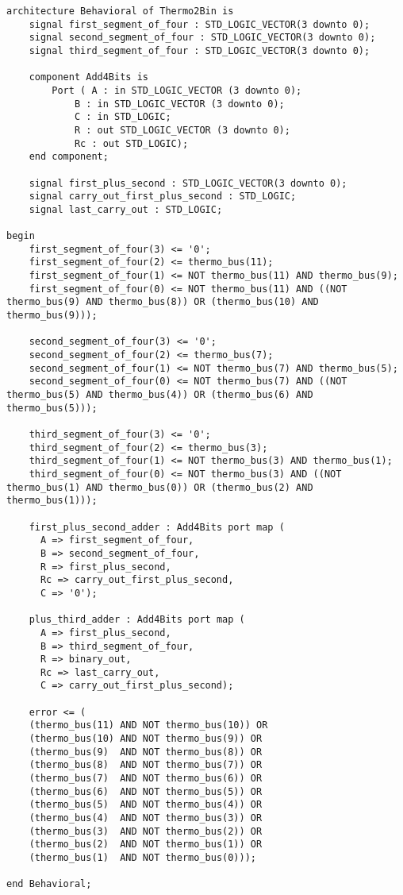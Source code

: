 \begin{verbatim}
architecture Behavioral of Thermo2Bin is
    signal first_segment_of_four : STD_LOGIC_VECTOR(3 downto 0);
    signal second_segment_of_four : STD_LOGIC_VECTOR(3 downto 0);
    signal third_segment_of_four : STD_LOGIC_VECTOR(3 downto 0);

    component Add4Bits is
        Port ( A : in STD_LOGIC_VECTOR (3 downto 0);
            B : in STD_LOGIC_VECTOR (3 downto 0);
            C : in STD_LOGIC;
            R : out STD_LOGIC_VECTOR (3 downto 0);
            Rc : out STD_LOGIC);
    end component;

    signal first_plus_second : STD_LOGIC_VECTOR(3 downto 0);
    signal carry_out_first_plus_second : STD_LOGIC;
    signal last_carry_out : STD_LOGIC;

begin
    first_segment_of_four(3) <= '0';
    first_segment_of_four(2) <= thermo_bus(11);
    first_segment_of_four(1) <= NOT thermo_bus(11) AND thermo_bus(9);
    first_segment_of_four(0) <= NOT thermo_bus(11) AND ((NOT thermo_bus(9) AND thermo_bus(8)) OR (thermo_bus(10) AND thermo_bus(9)));

    second_segment_of_four(3) <= '0';
    second_segment_of_four(2) <= thermo_bus(7);
    second_segment_of_four(1) <= NOT thermo_bus(7) AND thermo_bus(5);
    second_segment_of_four(0) <= NOT thermo_bus(7) AND ((NOT thermo_bus(5) AND thermo_bus(4)) OR (thermo_bus(6) AND thermo_bus(5)));

    third_segment_of_four(3) <= '0';
    third_segment_of_four(2) <= thermo_bus(3);
    third_segment_of_four(1) <= NOT thermo_bus(3) AND thermo_bus(1);
    third_segment_of_four(0) <= NOT thermo_bus(3) AND ((NOT thermo_bus(1) AND thermo_bus(0)) OR (thermo_bus(2) AND thermo_bus(1)));

    first_plus_second_adder : Add4Bits port map (
      A => first_segment_of_four,
      B => second_segment_of_four,
      R => first_plus_second,
      Rc => carry_out_first_plus_second,
      C => '0');

    plus_third_adder : Add4Bits port map (
      A => first_plus_second,
      B => third_segment_of_four,
      R => binary_out,
      Rc => last_carry_out,
      C => carry_out_first_plus_second);

    error <= (
    (thermo_bus(11) AND NOT thermo_bus(10)) OR
    (thermo_bus(10) AND NOT thermo_bus(9)) OR
    (thermo_bus(9)  AND NOT thermo_bus(8)) OR
    (thermo_bus(8)  AND NOT thermo_bus(7)) OR
    (thermo_bus(7)  AND NOT thermo_bus(6)) OR
    (thermo_bus(6)  AND NOT thermo_bus(5)) OR
    (thermo_bus(5)  AND NOT thermo_bus(4)) OR
    (thermo_bus(4)  AND NOT thermo_bus(3)) OR
    (thermo_bus(3)  AND NOT thermo_bus(2)) OR
    (thermo_bus(2)  AND NOT thermo_bus(1)) OR
    (thermo_bus(1)  AND NOT thermo_bus(0)));

end Behavioral;
\end{verbatim}
